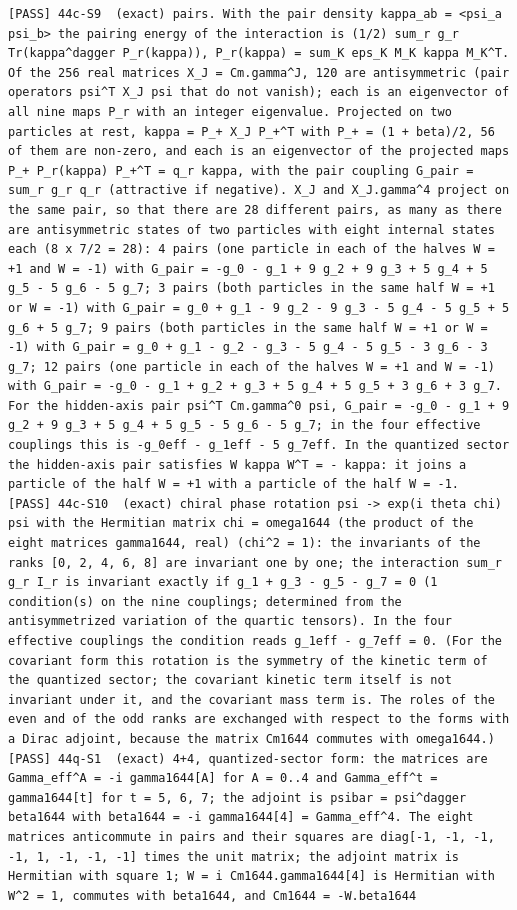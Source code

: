 \documentclass[
  10pt,
]{article}
\begin{document}
\begin{verbatim}
[PASS] 44c-S9  (exact) pairs. With the pair density kappa_ab = <psi_a psi_b> the pairing energy of the interaction is (1/2) sum_r g_r Tr(kappa^dagger P_r(kappa)), P_r(kappa) = sum_K eps_K M_K kappa M_K^T. Of the 256 real matrices X_J = Cm.gamma^J, 120 are antisymmetric (pair operators psi^T X_J psi that do not vanish); each is an eigenvector of all nine maps P_r with an integer eigenvalue. Projected on two particles at rest, kappa = P_+ X_J P_+^T with P_+ = (1 + beta)/2, 56 of them are non-zero, and each is an eigenvector of the projected maps P_+ P_r(kappa) P_+^T = q_r kappa, with the pair coupling G_pair = sum_r g_r q_r (attractive if negative). X_J and X_J.gamma^4 project on the same pair, so that there are 28 different pairs, as many as there are antisymmetric states of two particles with eight internal states each (8 x 7/2 = 28): 4 pairs (one particle in each of the halves W = +1 and W = -1) with G_pair = -g_0 - g_1 + 9 g_2 + 9 g_3 + 5 g_4 + 5 g_5 - 5 g_6 - 5 g_7; 3 pairs (both particles in the same half W = +1 or W = -1) with G_pair = g_0 + g_1 - 9 g_2 - 9 g_3 - 5 g_4 - 5 g_5 + 5 g_6 + 5 g_7; 9 pairs (both particles in the same half W = +1 or W = -1) with G_pair = g_0 + g_1 - g_2 - g_3 - 5 g_4 - 5 g_5 - 3 g_6 - 3 g_7; 12 pairs (one particle in each of the halves W = +1 and W = -1) with G_pair = -g_0 - g_1 + g_2 + g_3 + 5 g_4 + 5 g_5 + 3 g_6 + 3 g_7. For the hidden-axis pair psi^T Cm.gamma^0 psi, G_pair = -g_0 - g_1 + 9 g_2 + 9 g_3 + 5 g_4 + 5 g_5 - 5 g_6 - 5 g_7; in the four effective couplings this is -g_0eff - g_1eff - 5 g_7eff. In the quantized sector the hidden-axis pair satisfies W kappa W^T = - kappa: it joins a particle of the half W = +1 with a particle of the half W = -1.
[PASS] 44c-S10  (exact) chiral phase rotation psi -> exp(i theta chi) psi with the Hermitian matrix chi = omega1644 (the product of the eight matrices gamma1644, real) (chi^2 = 1): the invariants of the ranks [0, 2, 4, 6, 8] are invariant one by one; the interaction sum_r g_r I_r is invariant exactly if g_1 + g_3 - g_5 - g_7 = 0 (1 condition(s) on the nine couplings; determined from the antisymmetrized variation of the quartic tensors). In the four effective couplings the condition reads g_1eff - g_7eff = 0. (For the covariant form this rotation is the symmetry of the kinetic term of the quantized sector; the covariant kinetic term itself is not invariant under it, and the covariant mass term is. The roles of the even and of the odd ranks are exchanged with respect to the forms with a Dirac adjoint, because the matrix Cm1644 commutes with omega1644.)
[PASS] 44q-S1  (exact) 4+4, quantized-sector form: the matrices are Gamma_eff^A = -i gamma1644[A] for A = 0..4 and Gamma_eff^t = gamma1644[t] for t = 5, 6, 7; the adjoint is psibar = psi^dagger beta1644 with beta1644 = -i gamma1644[4] = Gamma_eff^4. The eight matrices anticommute in pairs and their squares are diag[-1, -1, -1, -1, 1, -1, -1, -1] times the unit matrix; the adjoint matrix is Hermitian with square 1; W = i Cm1644.gamma1644[4] is Hermitian with W^2 = 1, commutes with beta1644, and Cm1644 = -W.beta1644

\end{verbatim}
\end{document}
